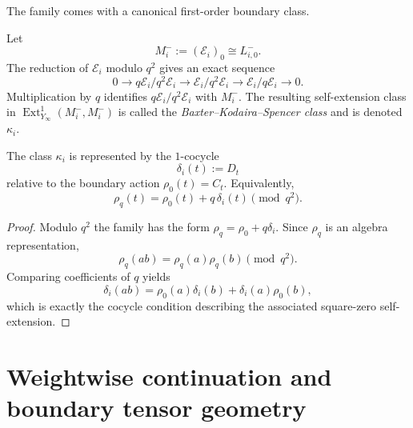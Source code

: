 The family comes with a canonical first-order boundary class.

\begin{definition}
\label{def:baxter-kodaira-spencer-class}
Let
\begin{equation}
M_i^-:=(\mathcal E_i)_0\cong L^-_{i,0}.
\end{equation}
The reduction of $\mathcal E_i$ modulo $q^2$ gives an exact sequence
\begin{equation}
0\longrightarrow q\mathcal E_i/q^2\mathcal E_i
\longrightarrow \mathcal E_i/q^2\mathcal E_i
\longrightarrow \mathcal E_i/q\mathcal E_i
\longrightarrow 0.
\end{equation}
Multiplication by $q$ identifies $q\mathcal E_i/q^2\mathcal E_i$ with
$M_i^-$. The resulting self-extension class in
$\operatorname{Ext}^1_{Y_\infty}(M_i^-,M_i^-)$ is called the
\emph{Baxter--Kodaira--Spencer class} and is denoted $\kappa_i$.
\end{definition}

\begin{theorem}
\ClaimStatusProvedHere
\label{thm:concrete-cocycle-representative}
The class $\kappa_i$ is represented by the $1$-cocycle
\begin{equation}
\delta_i(t):=D_t
\end{equation}
relative to the boundary action $\rho_0(t)=C_t$. Equivalently,
\begin{equation}
\rho_q(t)=\rho_0(t)+q\,\delta_i(t)\pmod{q^2}.
\end{equation}
\end{theorem}

\begin{proof}
Modulo $q^2$ the family has the form
$\rho_q=\rho_0+q\delta_i$. Since $\rho_q$ is an algebra representation,
\begin{equation}
\rho_q(ab)=\rho_q(a)\rho_q(b)\pmod{q^2}.
\end{equation}
Comparing coefficients of $q$ yields
\begin{equation}
\delta_i(ab)=\rho_0(a)\delta_i(b)+\delta_i(a)\rho_0(b),
\end{equation}
which is exactly the cocycle condition describing the associated
square-zero self-extension.
\end{proof}

\section{Weightwise continuation and boundary tensor geometry}
\label{sec:typeA-boundary-tensor-geometry}

